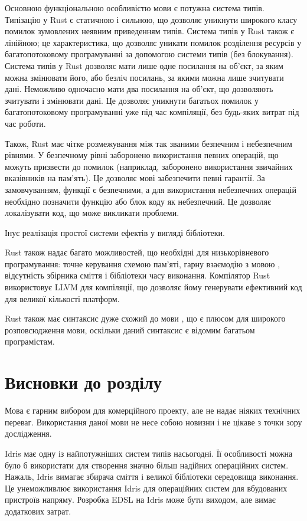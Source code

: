 \documentclass[oneside,14pt,a4paper,final]{myextreport}
\newcommand{\specialsection}[1]{\section*{#1}\addcontentsline{toc}{section}{#1}}
\newcommand{\chapterconslusions}{
  \clearpage
  \specialsection{Висновки до розділу \thechapter}
}
\begin{document}
Основною функціональною особливістю мови є потужна система типів. Типізацію у Rust є статичною і сильною, що дозволяє уникнути широкого класу помилок зумовлених неявним приведенням типів. Система типів у Rust також є лінійною; це характеристика, що дозволяє уникати помилок розділення ресурсів у багатопотоковому програмуванні за допомогою системи типів (без блокування). Система типів у Rust дозволяє мати лише одне посилання на об'єкт, за яким можна змінювати його, або безліч посилань, за якими можна лише зчитувати дані. Неможливо одночасно мати два посилання на об'єкт, що дозволяють зчитувати і змінювати дані. Це дозволяє уникнути багатьох помилок у багатопотоковому програмуванні уже під час компіляції, без будь-яких витрат під час роботи.

Також, Rust має чітке розмежування між так званими безпечним і небезпечним рівнями. У безпечному рівні заборонено використання певних операцій, що можуть призвести до помилок (наприклад, заборонено використання звичайних вказівників на пам'ять). Це дозволяє мові забезпечити певні гарантії. За замовчуванням, функції є безпечними, а для використання небезпечних операцій необхідно позначити функцію або блок коду як небезпечний. Це дозволяє локалізувати код, що може викликати проблеми.

Інує реалізація простої системи ефектів у вигляді бібліотеки.

Rust також надає багато можливостей, що необхідні для низькорівневого програмування: точне керування схемою пам'яті, гарну взаємодію з мовою \LangC{}, відсутність збірника сміття і бібліотеки часу виконання. Компілятор Rust використовує LLVM\cite{llvm} для компіляції, що дозволяє йому генерувати ефективний код для великої кількості платформ.

Rust також має синтаксис дуже схожий до мови \LangC{}, що є плюсом для широкого розповсюдження мови, оскільки даний синтаксис є відомим багатьом програмістам.

\chapterconslusions{}

Мова \LangC{} є гарним вибором для комерційного проекту, але не надає ніяких технічних переваг. Використання даної мови не несе собою новизни і не цікаве з точки зору дослідження.

Idris має одну із найпотужніших систем типів насьогодні. Її особливості можна було б використати для створення значно більш надійних операційних систем. Нажаль, Idris вимагає збирача сміття і великої бібліотеки середовища виконання. Це унеможливлює використання Idris для операційних систем для вбудованих пристроїв напряму. Розробка EDSL на Idris може бути виходом, але вимає додаткових затрат.
\end{document}
